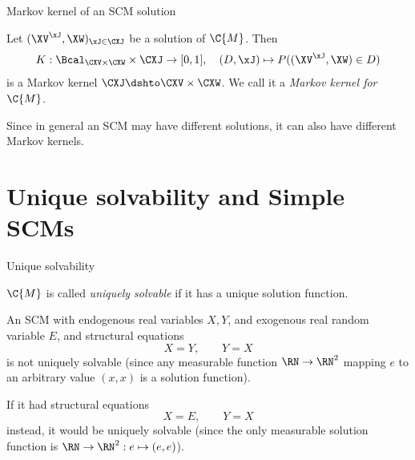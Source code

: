 \begin{frame}{Markov kernel of an SCM solution}
\begin{definition}
  Let $(\XV^{\xJ},\XW)_{\xJ\in\CXJ}$ be a solution of $\C{M}$. 
  Then
  $$K : \Bcal_{\CXV \times \CXW} \times \CXJ \to [0,1], \quad (D,\xJ) \mapsto P((\XV^{\xJ},\XW)\in D)$$
  is a Markov kernel $\CXJ \dshto \CXV \times \CXW$. We call it a \emph{Markov kernel for $\C{M}$}.

%
\end{definition}
Since in general an SCM may have different solutions, it can also have different Markov kernels.
\end{frame}

\part{Unique solvability and Simple SCMs}
\frame{\partpage}

\begin{frame}{Unique solvability}
\begin{definition}
  $\C{M}$ is called \emph{uniquely solvable} if it has a unique solution function. 
\end{definition}
\begin{example}
  An SCM with endogenous real variables $X,Y$, and exogenous real random variable $E$, and structural equations
  $$X = Y, \qquad Y = X$$
  is not uniquely solvable (since any measurable function $\RN \to \RN^2$ mapping $e$ to an arbitrary value $(x,x)$ is
  a solution function).

  If it had structural equations
  $$X = E, \qquad Y = X$$
  instead, it would be 
  uniquely solvable (since the only measurable solution function is $\RN \to \RN^2 : e \mapsto (e,e)$).
\end{example}
\end{frame}

